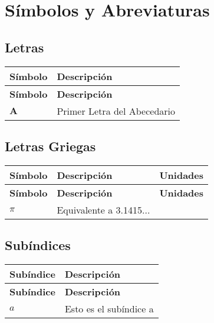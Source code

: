 \chapter{Símbolos y Abreviaturas}
\section*{Letras}
\begin{longtable}{>{\raggedright\arraybackslash}m{}>{\raggedright\arraybackslash}m{}}
	\textbf{Símbolo} & \textbf{Descripción} \\[0.5ex] \hline%
	\endfirsthead%
	\textbf{Símbolo} & \textbf{Descripción} \\[0.5ex] \hline%
	\endhead%
	$\mathbf{A}$ & Primer Letra del Abecedario\\
\end{longtable}

\section*{Letras Griegas}
\begin{longtable}{>{\raggedright\arraybackslash}m{}>{\raggedright\arraybackslash}m{}>{\centering\arraybackslash}m{}}
	\textbf{Símbolo} & \textbf{Descripción} & \textbf{Unidades} \\[0.5ex] \hline%
	\endfirsthead%
	\textbf{Símbolo} & \textbf{Descripción} & \textbf{Unidades} \\[0.5ex] \hline%
	\endhead%
	$\pi$ & Equivalente a 3.1415... & \\
\end{longtable}

\section*{Subíndices}
\begin{longtable}{>{\raggedright\arraybackslash}m{}>{\raggedright\arraybackslash}m{}}
	\textbf{Subíndice} & \textbf{Descripción} \\[0.5ex] \hline%
	\endfirsthead%
	\textbf{Subíndice} & \textbf{Descripción} \\[0.5ex] \hline%
	\endhead%
	$a$ & Esto es el subíndice a\\
\end{longtable}


